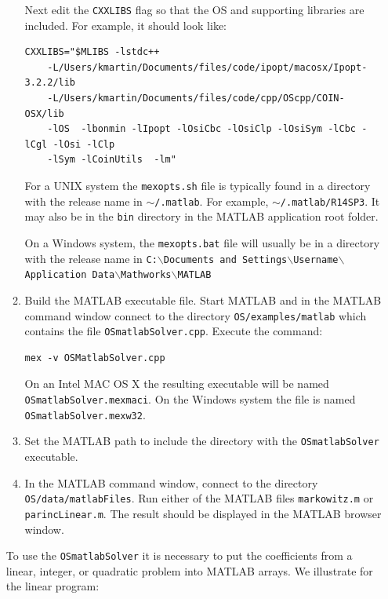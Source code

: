 \documentclass[11pt]{article}
\renewcommand{\_}{{\char"5F}}
\renewcommand{\{}{{\char"7B}}
\renewcommand{\}}{{\char"7D}}
\renewcommand{\^}{{\char"0D}}
\renewcommand{\'}{{\char"0D}}
\begin{document}
\begin{enumerate}[Step 1:]
\begin{enumerate}[{\bf Step 1:}]
Next edit the {\tt CXXLIBS} flag so that the OS and supporting libraries are included. For example, it should look like:

\begin{verbatim}
CXXLIBS="$MLIBS -lstdc++
    -L/Users/kmartin/Documents/files/code/ipopt/macosx/Ipopt-3.2.2/lib
    -L/Users/kmartin/Documents/files/code/cpp/OScpp/COIN-OSX/lib
    -lOS  -lbonmin -lIpopt -lOsiCbc -lOsiClp -lOsiSym -lCbc -lCgl -lOsi -lClp
    -lSym -lCoinUtils  -lm"
\end{verbatim}

For a UNIX system the {\tt mexopts.sh} file  is typically  found in a directory with the release name in {\tt  $\sim$/.matlab}. For example,
{\tt $\sim$/.matlab/R14SP3}.  It may also be in the {\tt bin} directory in the MATLAB application root folder. 


On a Windows system, the {\tt  mexopts.bat} file will usually be in a directory with the release name in {\tt C:$\backslash$Documents and Settings$\backslash$Username$\backslash$Application Data$\backslash$Mathworks$\backslash$MATLAB}


\item{}  Build the MATLAB executable file. Start MATLAB and in the MATLAB command window connect to the directory {\tt OS/examples/matlab} which  contains the file {\tt OSmatlabSolver.cpp}.    Execute the command:

\begin{verbatim}
mex -v OSMatlabSolver.cpp
\end{verbatim}

On an Intel MAC OS X the resulting executable will be named {\tt OSmatlabSolver.mexmaci}. On the Windows system the file is named {\tt OSmatlabSolver.mexw32}.

\item{}  Set the MATLAB path to include the directory with the {\tt OSmatlabSolver} executable. 


\item{}   In the MATLAB command window, connect to the directory {\tt OS/data/matlabFiles}. Run either of the MATLAB 
files {\tt markowitz.m} or {\tt parincLinear.m}.  The result should be displayed in the MATLAB browser window.  

\end{enumerate}


To use the {\tt OSmatlabSolver} it is necessary to put the coefficients  from a linear, integer, or quadratic problem into MATLAB arrays.   We illustrate for the linear program:


\end{enumerate}
\end{document}
